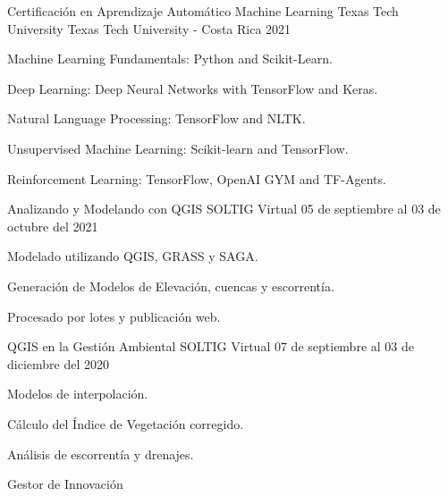 \begin{cventries}
{\begin{cvitems}
      \end{cvitems}
    }
  \cventry
    {Certificación en Aprendizaje Automático Machine Learning} %
    {Texas Tech University} %
    {Texas Tech University - Costa Rica} %
    {2021} %
    {
      \begin{cvitems} %
        \item Machine Learning Fundamentals: Python and Scikit-Learn.
        \item Deep Learning: Deep Neural Networks with TensorFlow and Keras.
        \item Natural Language Processing: TensorFlow and NLTK.
        \item Unsupervised Machine Learning: Scikit-learn and TensorFlow.
        \item Reinforcement Learning: TensorFlow, OpenAI GYM and TF-Agents.
      \end{cvitems}
    }
  \cventry
  {Analizando y Modelando con QGIS} %
    {SOLTIG} %
    {Virtual} %
    {05 de septiembre al 03 de octubre del 2021} %
    {
      \begin{cvitems} %
        \item Modelado utilizando QGIS, GRASS y SAGA.
        \item Generación de Modelos de Elevación, cuencas y escorrentía.
        \item Procesado por lotes y publicación web.
      \end{cvitems}
    }
  \cventry
  {QGIS en la Gestión Ambiental} %
    {SOLTIG} %
    {Virtual} %
    {07 de septiembre al 03 de diciembre del 2020} %
    {
      \begin{cvitems} %
        \item Modelos de interpolación.
        \item Cálculo del Índice de Vegetación corregido.
        \item Análisis de escorrentía y drenajes.
      \end{cvitems}
    }
  \cventry
  {Gestor de Innovación} %

\end{cventries}
